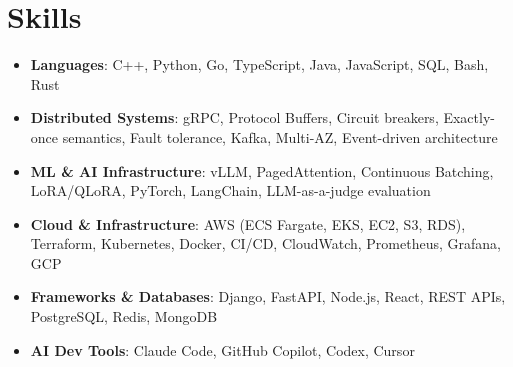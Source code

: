 \documentclass[letterpaper,11pt]{article}
\newcommand{\resumeSubHeadingListStart}{\begin{itemize}[leftmargin=0.15in, label={}]}
\newcommand{\resumeSubHeadingListEnd}{\end{itemize}}
\newcommand{\resumeSkillHeading}[2]{%
  \item\small{\textbf{#1}: #2 \vspace{-9pt}}%
}
\begin{document}
\section{Skills}
  \resumeSubHeadingListStart
    \resumeSkillHeading{Languages}{C++, Python, Go, TypeScript, Java, JavaScript, SQL, Bash, Rust}
    \resumeSkillHeading{Distributed Systems}{gRPC, Protocol Buffers, Circuit breakers, Exactly-once semantics, Fault tolerance, Kafka, Multi-AZ, Event-driven architecture}
    \resumeSkillHeading{ML \& AI Infrastructure}{vLLM, PagedAttention, Continuous Batching, LoRA/QLoRA, PyTorch, LangChain, LLM-as-a-judge evaluation}
    \resumeSkillHeading{Cloud \& Infrastructure}{AWS (ECS Fargate, EKS, EC2, S3, RDS), Terraform, Kubernetes, Docker, CI/CD, CloudWatch, Prometheus, Grafana, GCP}
    \resumeSkillHeading{Frameworks \& Databases}{Django, FastAPI, Node.js, React, REST APIs, PostgreSQL, Redis, MongoDB}
    \resumeSkillHeading{AI Dev Tools}{Claude Code, GitHub Copilot, Codex, Cursor}
  \resumeSubHeadingListEnd
\end{document}
